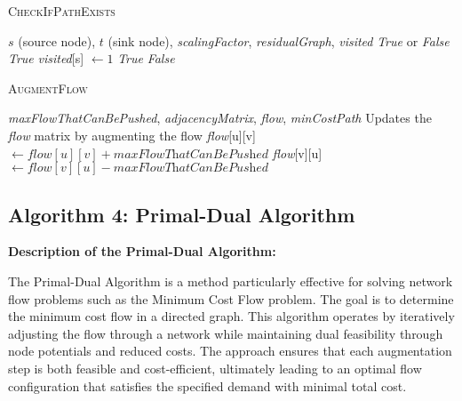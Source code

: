 \documentclass{article}
\begin{document}
\begin{algorithm}[H]
\caption{\textcolor{keywordcolor}{\textsc{CheckIfPathExists}}}
\begin{algorithmic}[1]
\State {} $s$ (source node), $t$ (sink node), \textit{scalingFactor}, \textit{residualGraph}, \textit{visited}
\State {} \textit{True} or \textit{False}
    \State \Return \textit{True}
\EndIf
\State \textit{visited}[s] $\gets 1$
            \State \Return \textit{True}
        \EndIf
    \EndIf
\EndFor
\State \Return \textit{False}
\end{algorithmic}
\end{algorithm}

\begin{algorithm}[H]
\caption{\textcolor{keywordcolor}{\textsc{AugmentFlow}}}
\begin{algorithmic}[1]
\State {} \textit{maxFlowThatCanBePushed}, \textit{adjacencyMatrix}, \textit{flow}, \textit{minCostPath}
\State {} Updates the \textit{flow} matrix by augmenting the flow
        \State \textit{flow}[u][v] $\gets \textit{flow}[u][v] + \textit{maxFlowThatCanBePushed}$
        \State \textit{flow}[v][u] $\gets \textit{flow}[v][u] - \textit{maxFlowThatCanBePushed}$
    \EndIf
\EndFor
\end{algorithmic}
\end{algorithm}

\subsection{Algorithm 4: Primal-Dual Algorithm}

\textbf{Description of the Primal-Dual Algorithm:}

The Primal-Dual Algorithm is a method particularly effective for solving network flow problems such as the Minimum Cost Flow problem. The goal is to determine the minimum cost flow in a directed graph. This algorithm operates by iteratively adjusting the flow through a network while maintaining dual feasibility through node potentials and reduced costs. The approach ensures that each augmentation step is both feasible and cost-efficient, ultimately leading to an optimal flow configuration that satisfies the specified demand with minimal total cost.~\cite{topcoder, primaldual}
\end{document}
